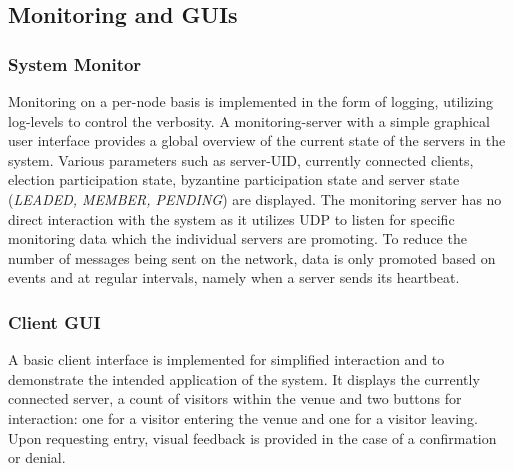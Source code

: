 \documentclass[runningheads]{llncs}
\begin{document}
\subsection{Monitoring and GUIs}

\subsubsection{System Monitor}
Monitoring on a per-node basis is implemented in the form of logging, utilizing log-levels to control the verbosity. A monitoring-server with a simple graphical user interface provides a global overview of the current state of the servers in the system. Various parameters such as server-UID, currently connected clients, election participation state, byzantine participation state and server state (\textit{LEADED, MEMBER, PENDING}) are displayed. The monitoring server has no direct interaction with the system as it utilizes UDP to listen for specific monitoring data which the individual servers are promoting. To reduce the number of messages being sent on the network, data is only promoted based on events and at regular intervals, namely when a server sends its heartbeat.

\subsubsection{Client GUI}
A basic client interface is implemented for simplified interaction and to demonstrate the intended application of the system. It displays the currently connected server, a count of visitors within the venue and two buttons for interaction: one for a visitor entering the venue and one for a visitor leaving. Upon requesting entry, visual feedback is provided in the case of a confirmation or denial.
\end{document}
